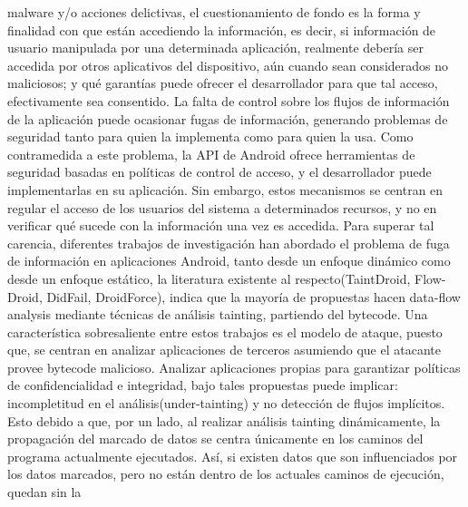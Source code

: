 malware y/o acciones delictivas, el cuestionamiento de fondo es la forma y
finalidad con que están accediendo la información, es decir, si información
de usuario manipulada por una determinada aplicación, realmente debería ser
accedida por otros aplicativos del dispositivo, aún cuando sean considerados no
maliciosos; y qué garantías puede ofrecer el desarrollador para que tal acceso,
efectivamente sea consentido.\newline 
La falta de control sobre los flujos de información de la aplicación puede
ocasionar fugas de información, generando problemas de seguridad tanto para
quien la implementa como para quien la usa.\newline
Como contramedida a este problema, la API de Android ofrece herramientas de
seguridad basadas en políticas de control de acceso, y el desarrollador puede
implementarlas en su aplicación. Sin embargo, estos mecanismos se centran en
regular el acceso de los usuarios del sistema a determinados recursos, y no en
verificar qué sucede con la información una vez es accedida.\newline 
Para superar tal carencia, diferentes trabajos de investigación han abordado el
problema de fuga de información en aplicaciones Android, tanto desde un enfoque
dinámico como desde un enfoque estático, la literatura existente al
respecto(TaintDroid\cite{TaintDroid}, Flow-Droid\cite{FlowDroid-Thesis},
DidFail\cite{DidFail}, DroidForce\cite{DroidForce}), indica que la mayoría de
propuestas hacen data-flow analysis mediante técnicas de análisis 
tainting, partiendo del bytecode. Una característica sobresaliente entre estos
trabajos es el modelo de ataque, puesto que, se centran en analizar aplicaciones
de terceros asumiendo que el atacante provee bytecode malicioso.\newline
Analizar aplicaciones propias para garantizar políticas de confidencialidad e
integridad, bajo tales propuestas puede implicar:
incompletitud en el análisis(under-tainting)
y no detección de flujos implícitos. Esto debido a que, 
por un lado, al realizar análisis tainting dinámicamente, la propagación del
marcado de datos se centra únicamente en los caminos del programa actualmente
ejecutados. Así, si existen datos que son influenciados por los datos marcados,
pero no están dentro de los actuales caminos de ejecución, quedan sin la
